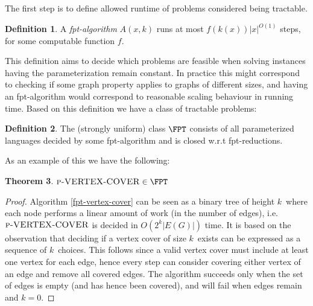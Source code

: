 \documentclass[a4paper,11pt]{report}
\theoremstyle{plain}
\newtheorem{thm}{Theorem}[chapter] %
\theoremstyle{definition}
\newtheorem{defn}[thm]{Definition} %
\begin{document}
The first step is to define allowed runtime of problems considered being tractable.

\begin{defn}
A \emph{fpt-algorithm} $A(x, k)$ runs at most $f(k(x)) |x|^{O(1)}$ steps, for some computable function $f$.
\end{defn}

This definition aims to decide which problems are feasible when solving instances having the parameterization remain constant.
In practice this might correspond to checking if some graph property applies to graphs of different sizes, and having an fpt-algorithm
would correspond to reasonable scaling behaviour in running time.
Based on this definition we have a class of tractable problems:

\begin{defn}
The (strongly uniform) class $\FPT$ consists of all parameterized languages decided by some fpt-algorithm and is closed w.r.t fpt-reductions.
\end{defn}

As an example of this we have the following:
\begin{thm}
$\textsc{p-VERTEX-COVER} \in \FPT$
\end{thm}

\begin{proof}
Algorithm \ref{fpt-vertex-cover} can be seen as a binary tree of height $k$ where each node performs a linear amount of work (in the number of edges), i.e. $\textsc{p-VERTEX-COVER}$ is decided in $O(2^k |E(G)|)$ time.
It is based on the observation that deciding if a vertex cover of size $k$ exists can be expressed as a sequence of $k$ choices.
This follows since a valid vertex cover must include at least one vertex for each edge, hence every step can consider covering either vertex of an edge and remove all covered edges.
The algorithm succeeds only when the set of edges is empty (and has hence been covered), and will fail when edges remain and $k = 0$.
\end{proof}
\end{document}
